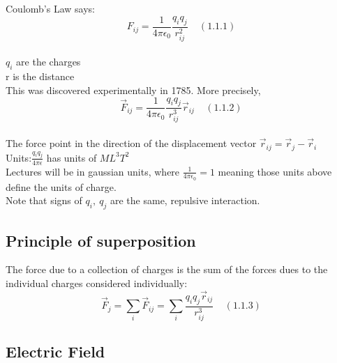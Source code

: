 \documentclass[a4paper,11pt]{article}
\begin{document}
Coulomb's Law says:\\
$$F_{ij} = \frac{1}{4\pi \epsilon _0} \frac{q_i q_j}{r_{ij} ^2}~~~~~ (1.1.1)$$\\
$q_i$ are the charges\\
r is the distance\\
This was discovered experimentally in 1785. More precisely,\\
$$\vec{F}_{ij} = \frac{1}{4\pi \epsilon _0} \frac{q_i q_j}{r_{ij} ^3}\vec{r}_{ij}~~~~~ (1.1.2)$$\\
The force point in the direction of the displacement vector $\vec{r}_{ij}=\vec{r}_j - \vec{r}_i$\\
Units:$\frac{q_i q_j}{4\pi \epsilon}$ has units of $ML^3 T^2$\\
Lectures will be in gaussian units, where $\frac{1}{4\pi \epsilon _0} = 1$ meaning those units above define the units of charge.\\
Note that signs of $q_i,~q_j$ are the same, repulsive interaction.

\subsection{Principle of superposition}

The force due to a collection of charges is the sum of the forces dues to the individual charges considered individually:\\

$$\vec{F}_j = \sum_i \vec{F}_{ij} = \sum_i \frac{q_i q_j \vec{r}_{ij}}{r_{ij}^3} ~~~~~(1.1.3)$$

\subsection{Electric Field}
\end{document}
